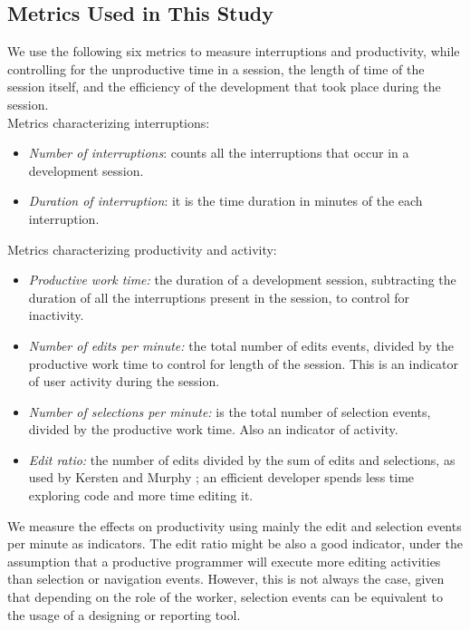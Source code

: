 \documentclass[times]{smrauth}
\begin{document}
\subsection{Metrics Used in This Study}
We use the following six metrics to measure interruptions and productivity, while controlling for the unproductive time in a session, the length of time of the session itself, and the efficiency of the development that took place during the session.
\\

Metrics characterizing interruptions:
\begin{itemize}
	\item \textit{Number of interruptions}:  counts all the interruptions that occur in a development session.
	\item \textit{Duration of interruption}:  it is the time duration in minutes of the each interruption. 
\end{itemize}

Metrics characterizing productivity and activity:
\begin{itemize}
	\item \textit{Productive work time:} the duration of a development session, subtracting the duration of all the interruptions present in the session, to control for inactivity.
	\item \textit{Number of edits per minute:} the total number of edits events, divided by the productive work time to control for length of the session. This is an indicator of user activity during the session.
	\item \textit{Number of selections per minute:} is the total number of selection events, divided by the productive work time. Also an indicator of activity.
	\item \textit{Edit ratio:} the number of edits divided by the sum of edits and selections, as used by Kersten and Murphy \cite{KM06}; an efficient developer spends less time exploring code and more time editing it.
\end{itemize} 

We measure the effects on productivity using mainly the edit and selection events per minute as indicators. The edit ratio might be also a good indicator, under the assumption that a productive programmer will execute more editing activities than selection or navigation events. However, this is not always the case, given that depending on the role of the worker, selection events can be equivalent to the usage of a designing or reporting tool. 
\end{document}
